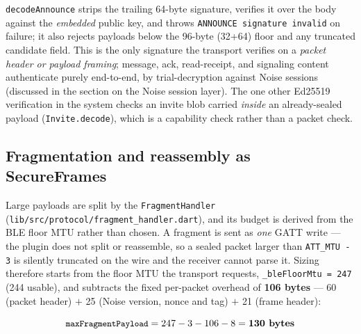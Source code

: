 \documentclass[11pt]{report}
\newcommand{\code}[1]{\texttt{\small #1}}
\begin{document}
\code{decodeAnnounce} strips the trailing 64-byte signature, verifies it over the body against the \emph{embedded} public key, and throws \code{ANNOUNCE signature invalid} on failure; it also rejects payloads below the 96-byte (32+64) floor and any truncated candidate field. This is the only signature the transport verifies on a \emph{packet header or payload framing}; message, ack, read-receipt, and signaling content authenticate purely end-to-end, by trial-decryption against Noise sessions (discussed in the section on the Noise session layer). The one other Ed25519 verification in the system checks an invite blob carried \emph{inside} an already-sealed payload (\code{Invite.decode}), which is a capability check rather than a packet check.

\subsection*{Fragmentation and reassembly as SecureFrames}

Large payloads are split by the \code{FragmentHandler} (\code{lib/src/protocol/fragment_handler.dart}), and its budget is derived from the BLE floor MTU rather than chosen. A fragment is sent as \emph{one} GATT write — the plugin does not split or reassemble, so a sealed packet larger than \code{ATT\_MTU - 3} is silently truncated on the wire and the receiver cannot parse it. Sizing therefore starts from the floor MTU the transport requests, \code{\_bleFloorMtu = 247} (244 usable), and subtracts the fixed per-packet overhead of \textbf{106 bytes} --- 60 (packet header) $+$ 25 (Noise version, nonce and tag) $+$ 21 (frame header):

\[ \code{maxFragmentPayload} = 247 - 3 - 106 - 8 = \textbf{130 bytes} \]
\end{document}
